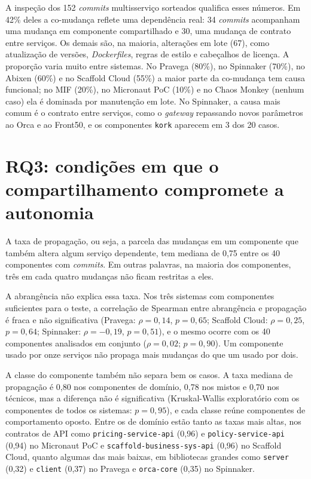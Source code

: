 A inspeção dos 152 \textit{commits} multisserviço sorteados qualifica esses números. Em 42\% deles a co-mudança reflete uma dependência real: 34 \textit{commits} acompanham uma mudança em componente compartilhado e 30, uma mudança de contrato entre serviços. Os demais são, na maioria, alterações em lote (67), como atualização de versões, \textit{Dockerfiles}, regras de estilo e cabeçalhos de licença. A proporção varia muito entre sistemas. No Pravega (80\%), no Spinnaker (70\%), no Abixen (60\%) e no Scaffold Cloud (55\%) a maior parte da co-mudança tem causa funcional; no MIF (20\%), no Micronaut PoC (10\%) e no Chaos Monkey (nenhum caso) ela é dominada por manutenção em lote. No Spinnaker, a causa mais comum é o contrato entre serviços, como o \textit{gateway} repassando novos parâmetros ao Orca e ao Front50, e os componentes \texttt{kork} aparecem em 3 dos 20 casos.

\section{RQ3: condições em que o compartilhamento compromete a autonomia}
\label{sec:res-rq3}

A taxa de propagação, ou seja, a parcela das mudanças em um componente que também altera algum serviço dependente, tem mediana de 0,75 entre os 40 componentes com \textit{commits}. Em outras palavras, na maioria dos componentes, três em cada quatro mudanças não ficam restritas a eles.

A abrangência não explica essa taxa. Nos três sistemas com componentes suficientes para o teste, a correlação de Spearman entre abrangência e propagação é fraca e não significativa (Pravega: $\rho = 0{,}14$, $p = 0{,}65$; Scaffold Cloud: $\rho = 0{,}25$, $p = 0{,}64$; Spinnaker: $\rho = -0{,}19$, $p = 0{,}51$), e o mesmo ocorre com os 40 componentes analisados em conjunto ($\rho = 0{,}02$; $p = 0{,}90$). Um componente usado por onze serviços não propaga mais mudanças do que um usado por dois.

A classe do componente também não separa bem os casos. A taxa mediana de propagação é 0,80 nos componentes de domínio, 0,78 nos mistos e 0,70 nos técnicos, mas a diferença não é significativa (Kruskal-Wallis exploratório com os componentes de todos os sistemas: $p = 0{,}95$), e cada classe reúne componentes de comportamento oposto. Entre os de domínio estão tanto as taxas mais altas, nos contratos de API como \texttt{pricing-service-api} (0,96) e \texttt{policy-service-api} (0,94) no Micronaut PoC e \texttt{scaffold-business-sys-api} (0,96) no Scaffold Cloud, quanto algumas das mais baixas, em bibliotecas grandes como \texttt{server} (0,32) e \texttt{client} (0,37) no Pravega e \texttt{orca-core} (0,35) no Spinnaker.

